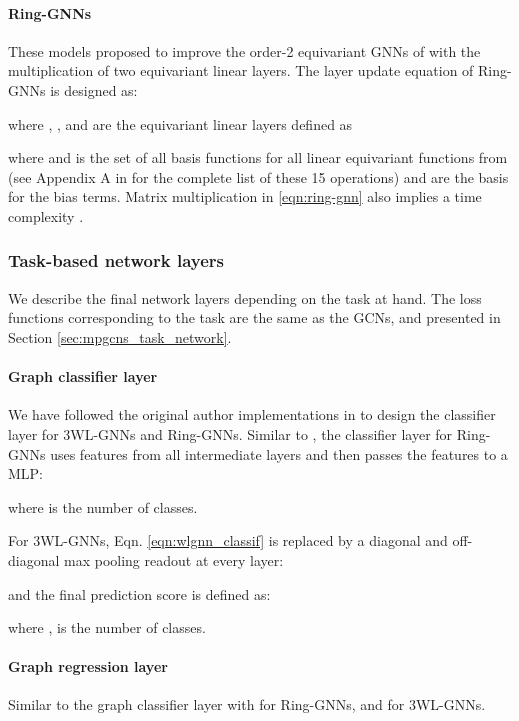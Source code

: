\documentclass{article}
\begin{document}
\paragraph{Ring-GNNs \cite{chen2019equivalence}}
These models proposed to improve the order-2 equivariant GNNs of \cite{maron2018invariant} with the multiplication of two equivariant linear layers. The layer update equation of Ring-GNNs is designed as: 

where , , and  are the equivariant linear layers defined as 

where  and  is the set of all basis functions for all linear equivariant functions from  (see Appendix A in \cite{maron2018invariant} for the complete list of these 15 operations) and  are the basis for the bias terms. Matrix multiplication in \eqref{eqn:ring-gnn} also implies a time complexity .








\subsubsection{Task-based network layers}


We describe the final network layers depending on the task at hand. The loss functions corresponding to the task are the same as the GCNs, and presented in Section \ref{sec:mpgcns_task_network}.


\paragraph{Graph classifier layer} 
We have followed the original author implementations in \cite{maron2019provably,maron2018invariant,chen2019equivalence} to design the classifier layer for 3WL-GNNs and Ring-GNNs. Similar to \cite{xu2018representation,xu2018how}, the classifier layer for Ring-GNNs uses features from all intermediate layers and then passes the features to a MLP:

where  is the number of classes.

For 3WL-GNNs, Eqn. \eqref{eqn:wlgnn_classif} is replaced by a diagonal and off-diagonal max pooling readout \cite{maron2019provably, maron2018invariant} at every layer:

and the final prediction score is defined as:

where ,  is the number of classes. 



\paragraph{Graph regression layer} 
Similar to the graph classifier layer with  for Ring-GNNs, and  for 3WL-GNNs.
\end{document}
